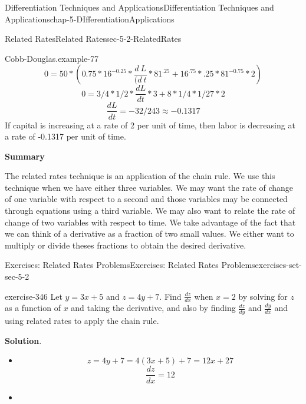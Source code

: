 \documentclass[oneside,10pt,]{book}
\newcommand{\terminology}[1]{\textbf{#1}}
\numberwithin{equation}{section}
\begin{document}
\begin{chapterptx}{Differentiation Techniques and Applications}{}{Differentiation Techniques and Applications}{}{}{chap-5-DIfferentiationApplications}
\begin{sectionptx}{Related Rates}{}{Related Rates}{}{}{sec-5-2-RelatedRates}
\begin{example}{Cobb-Douglas.}{example-77}
\begin{equation*}
0=50*(0.75*16^{-0.25}*\frac{d\ L}{(d\ t}*81^{.25}+16^{.75}*.25*81^{-0.75}*2)
\end{equation*}
%
\begin{equation*}
0=3/4*1/2*\frac{dL}{dt}*3+8*1/4*1/27*2
\end{equation*}
%
\begin{equation*}
\frac{dL}{dt}=-32/243\approx -0.1317
\end{equation*}
\hypertarget{p-1971}{}%
If capital is increasing at a rate of 2 per unit of time, then labor is decreasing at a rate of -0.1317 per unit of time.%
\end{example}
\hypertarget{p-1972}{}%
\terminology{Summary}%
\par
\hypertarget{p-1973}{}%
The related rates technique is an application of the chain rule.  We use this technique when we have either three variables.  We may want the rate of change of one variable with respect to a second and those variables may be connected through equations using a third variable.  We may also want to relate the rate of change of two variables with respect to time.  We take advantage of the fact that we can think of a derivative as a fraction of two small values.  We either want to multiply or divide theses fractions to obtain the desired derivative.%
%
%
\typeout{************************************************}
\typeout{************************************************}
%
\begin{exercises-subsection-numberless}{Exercises: Related Rates Problems}{}{Exercises: Related Rates Problems}{}{}{exercises-set-sec-5-2}
\begin{divisionexercise}{1}{}{}{exercise-346}%
\hypertarget{p-1974}{}%
Let \(y=3x+5\) and \(z=4y+7\). Find \(\frac{dz}{dx}\) when \(x=2\) by solving for \(z\) as a function of \(x\) and taking the derivative, and also by finding \(\frac{dz}{dy}\) and \(\frac{dy}{dx}\) and using related rates to apply the chain rule.%
\par\smallskip%
\noindent\textbf{Solution}.\hypertarget{solution-174}{}\quad%
\leavevmode%
\begin{itemize}[label=\textbullet]
\item{}%
\begin{equation*}
z=4y+7= 4(3x+5)+7=12x+27
\end{equation*}
%
\begin{equation*}
\frac{dz}{dx}=12
\end{equation*}
%
\item{}%

\end{itemize}
\end{divisionexercise}
\end{exercises-subsection-numberless}
\end{sectionptx}
\end{chapterptx}
\end{document}
